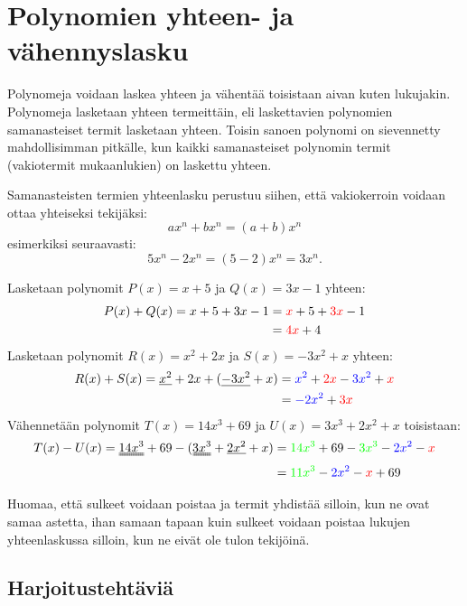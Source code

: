 \chapter{Polynomien yhteen- ja vähennyslasku}

Polynomeja voidaan laskea yhteen ja vähentää toisistaan aivan kuten lukujakin.
Polynomeja lasketaan yhteen termeittäin, eli laskettavien polynomien
samanasteiset termit lasketaan yhteen. Toisin sanoen polynomi on sievennetty
mahdollisimman pitkälle, kun kaikki samanasteiset polynomin termit
(vakiotermit mukaanlukien) on laskettu yhteen.

Samanasteisten termien yhteenlasku perustuu siihen, että vakiokerroin voidaan
ottaa yhteiseksi tekijäksi:
\[
ax^n+bx^n=(a+b)x^n
\]
esimerkiksi seuraavasti:
\[
5x^n-2x^n=(5-2)x^n=3x^n.
\]


\begin{esimerkki}
Lasketaan polynomit $P(x)=x+5$ ja $Q(x)=3x-1$ yhteen:
    \begin{align*}
        P(x)+Q(x)=x+5 + 3x-1 &= \textcolor{red}{x} + 5 + 
        \textcolor{red}{3x} - 1 \\
        &= \textcolor{red}{4x} + 4
    \end{align*}
Lasketaan polynomit $R(x)=x^2+2x$ ja $S(x)=-3x^2+x$ yhteen:
    \begin{align*}
        R(x)+S(x)=\uline{x^2} + 2x 
            + (\uline{-3x^2} + x)
        &= \textcolor{blue}{x^2} + \textcolor{red}{2x} - \textcolor{blue}{3x^2} 
            + \textcolor{red}{x} \\
        &= \textcolor{blue}{-2x^2} + \textcolor{red}{3x}
    \end{align*}
Vähennetään polynomit $T(x)=14x^3+69$ ja $U(x)=3x^3+2x^2+x$ toisistaan:
    \begin{align*}
        T(x)-U(x)=\uuline{14x^3} + 69 - (\uuline{3x^3} + 
            \uline{2x^2} + x) 
        &= \textcolor{green}{14x^3} + 69 - \textcolor{green}{3x^3} - 
            \textcolor{blue}{2x^2} - \textcolor{red}{x} \\
        &= \textcolor{green}{11x^3} - \textcolor{blue}{2x^2} - \textcolor{red}{x} + 69
    \end{align*}
\end{esimerkki}


Huomaa, että sulkeet voidaan poistaa ja termit yhdistää silloin, kun ne ovat
samaa astetta, ihan samaan tapaan kuin sulkeet voidaan poistaa lukujen
yhteenlaskussa silloin, kun ne eivät ole tulon tekijöinä.

\section{Harjoitustehtäviä}

